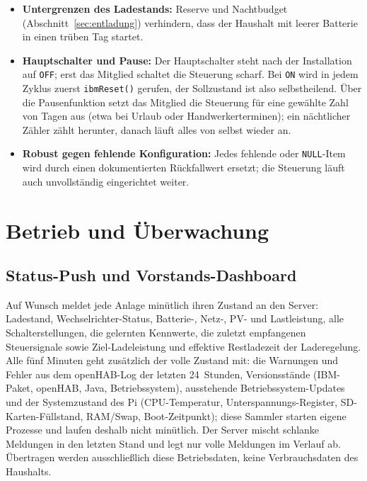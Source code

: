 \documentclass[11pt,a4paper]{article}
\newcommand{\code}[1]{\texttt{#1}}
\begin{document}
\begin{itemize}
    überschritten, weder durch Einstellungen noch durch die
    Kapazitätsschätzung.
  \item \textbf{Untergrenzen des Ladestands:} Reserve und Nachtbudget
    (Abschnitt~\ref{sec:entladung}) verhindern, dass der Haushalt mit
    leerer Batterie in einen trüben Tag startet.
  \item \textbf{Hauptschalter und Pause:} Der Hauptschalter steht nach der
    Installation auf \code{OFF}; erst das Mitglied schaltet die Steuerung
    scharf. Bei \code{ON} wird in jedem Zyklus zuerst
    \code{ibmReset()} gerufen, der Sollzustand ist also selbstheilend.
    Über die Pausenfunktion setzt das Mitglied die Steuerung für eine
    gewählte Zahl von Tagen aus (etwa bei Urlaub oder Handwerkerterminen);
    ein nächtlicher Zähler zählt herunter, danach läuft alles von selbst
    wieder an.
  \item \textbf{Robust gegen fehlende Konfiguration:} Jedes fehlende oder
    \code{NULL}-Item wird durch einen dokumentierten Rückfallwert ersetzt;
    die Steuerung läuft auch unvollständig eingerichtet weiter.
\end{itemize}

\section{Betrieb und Überwachung}

\subsection{Status-Push und Vorstands-Dashboard}

Auf Wunsch meldet jede Anlage minütlich ihren Zustand an den Server:
Ladestand, Wechselrichter-Status, Batterie-, Netz-, PV- und Lastleistung,
alle Schalterstellungen, die gelernten Kennwerte, die zuletzt empfangenen
Steuersignale sowie Ziel-Ladeleistung und effektive Restladezeit der
Laderegelung. Alle fünf Minuten geht zusätzlich der volle Zustand mit: die
Warnungen und Fehler aus dem openHAB-Log der letzten 24~Stunden,
Versionsstände (IBM-Paket, openHAB, Java, Betriebssystem), ausstehende
Betriebssystem-Updates und der Systemzustand des Pi (CPU-Temperatur,
Unterspannungs-Register, SD-Karten-Füllstand, RAM/Swap, Boot-Zeitpunkt);
diese Sammler starten eigene Prozesse und laufen deshalb nicht minütlich.
Der Server mischt schlanke Meldungen in den letzten Stand und legt nur
volle Meldungen im Verlauf ab. Übertragen werden ausschließlich diese
Betriebsdaten, keine Verbrauchsdaten des Haushalts.
\end{document}

